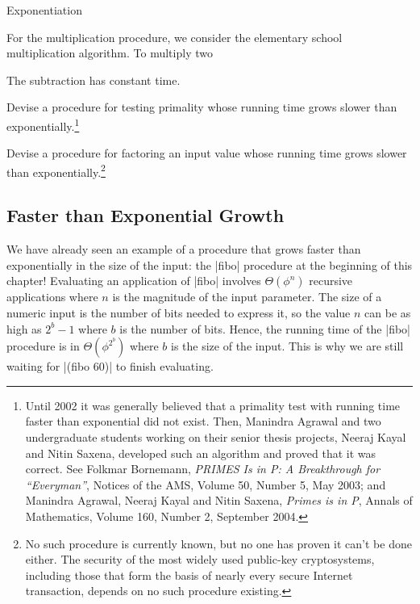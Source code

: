 \begin{schemeregion}
{{\begin{example}{Exponentiation}
  
For the multiplication procedure, we consider the elementary school multiplication algorithm.  To multiply two 

The subtraction has constant time.  

\end{example}
}

\begin{exercise} \triplegoldstar
Devise a procedure for testing primality whose running time grows slower than exponentially.\footnote{Until 2002 it was generally believed that a primality test with running time faster than exponential did not exist.  Then, Manindra Agrawal and two undergraduate students working on their senior thesis projects, Neeraj Kayal and Nitin Saxena, developed such an algorithm and proved that it was correct.  See Folkmar Bornemann, \emph{PRIMES Is in P: A Breakthrough for ``Everyman''}, Notices of the AMS, Volume 50, Number 5, May 2003; and Manindra Agrawal, Neeraj Kayal and Nitin Saxena, \emph{Primes is in P}, Annals of Mathematics, Volume 160, Number 2, September 2004.}
\end{exercise}

\begin{exercise} \quadgoldstar
Devise a procedure for factoring an input value whose running time grows slower than exponentially.\footnote{No such procedure is currently known, but no one has proven it can't be done either.  The security of the most widely used public-key cryptosystems, including those that form the basis of nearly every secure Internet transaction, depends on no such procedure existing.}
\end{exercise}
}

\subsection{Faster than Exponential Growth}

We have already seen an example of a procedure that grows faster than exponentially in the size of the input: the \scheme|fibo| procedure at the beginning of this chapter!  Evaluating an application of \scheme|fibo| involves $\Theta(\phi^n)$ recursive applications where $n$ is the magnitude of the input parameter.  The size of a numeric input is the number of bits needed to express it, so the value $n$ can be as high as $2^b - 1$ where $b$ is the number of bits.  Hence, the running time of the \scheme|fibo| procedure is in $\Theta(\phi^{2^b})$ where $b$ is the size of the input.  This is why we are still waiting for \scheme|(fibo 60)| to finish evaluating. 	


\end{schemeregion}
